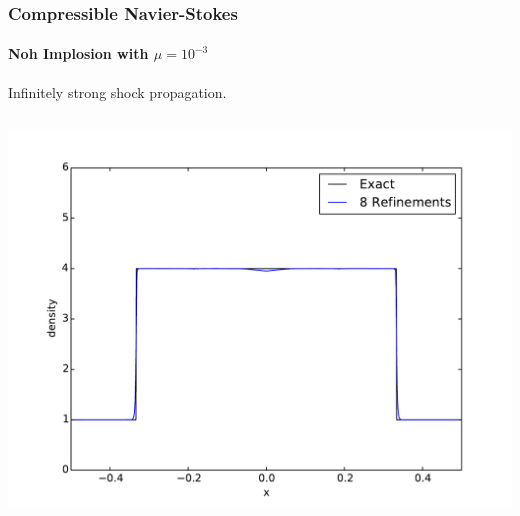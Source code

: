 \documentclass[18pt,xcolor=table]{beamer}
\begin{document}
%                                
%                                
% 
\begin{frame}[t]
\frametitle{Compressible Navier-Stokes}
\framesubtitle{Noh Implosion with $\mu=10^{-3}$}  %
Infinitely strong shock propagation.
\vspace{4ex}

\begin{columns}[t] %
\begin{column}[T]{0.4\textwidth} %
\centering
\includegraphics[height=1.0\textwidth]{Noh/MinNSDecoupled/den9.pdf}
\end{column}
\hspace{8ex}

\end{columns}
\end{frame}
\end{document}
